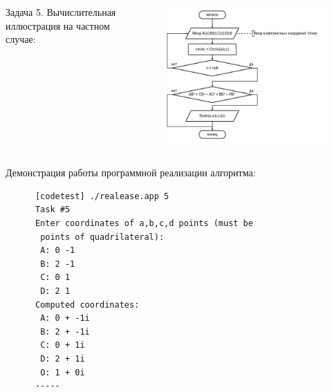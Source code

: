 \documentclass{beamer}
\begin{document}
\begin{frame}
   \begin{columns}
      \begin{column}{0.3\textwidth}
         \begin{block}{Задача 5. Вычислительная иллюстрация на частном случае:}
         \end{block}
      \end{column}
      \begin{column}{0.7\textwidth}
         \begin{figure}[h]
            \includegraphics[width=1\textwidth]{images/task5-diagram.png}
         \end{figure}
      \end{column}
   \end{columns}
\end{frame}

\begin{frame}[fragile]
   Демонстрация работы программной реализации алгоритма:
   \begin{verbatim}
      [codetest] ./realease.app 5
      Task #5
      Enter coordinates of a,b,c,d points (must be
       points of quadrilateral):
       A: 0 -1
       B: 2 -1
       C: 0 1
       D: 2 1
      Computed coordinates:
       A: 0 + -1i
       B: 2 + -1i
       C: 0 + 1i
       D: 2 + 1i
       O: 1 + 0i
      -----
   \end{verbatim}
\end{frame}
\end{document}
